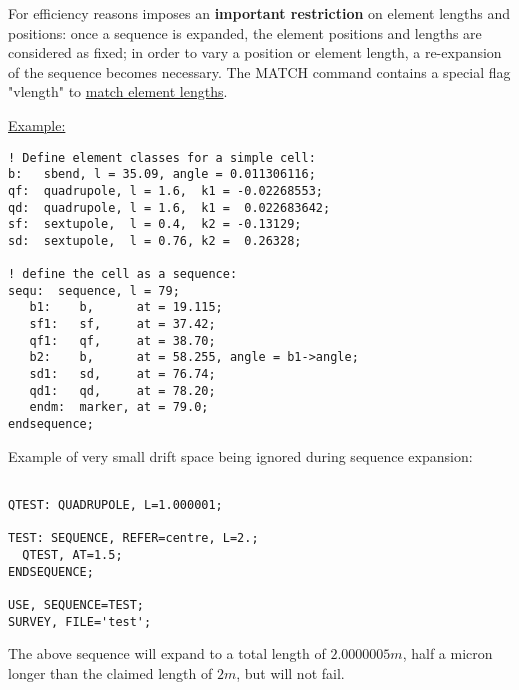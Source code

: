 For efficiency reasons \madx imposes an \textbf{important restriction}
on element lengths and positions: once a sequence is expanded, the
element positions and lengths are considered as fixed; in order to vary
a position or element length, a re-expansion of the sequence becomes
necessary. The MATCH command contains a special flag "vlength" to
\href{../match/match.html}{match element lengths}.  

\href{example}{Example:}
\begin{verbatim}
! Define element classes for a simple cell:
b:   sbend, l = 35.09, angle = 0.011306116;
qf:  quadrupole, l = 1.6,  k1 = -0.02268553;
qd:  quadrupole, l = 1.6,  k1 =  0.022683642;
sf:  sextupole,  l = 0.4,  k2 = -0.13129;
sd:  sextupole,  l = 0.76, k2 =  0.26328;

! define the cell as a sequence:
sequ:  sequence, l = 79;
   b1:    b,      at = 19.115;
   sf1:   sf,     at = 37.42;
   qf1:   qf,     at = 38.70;
   b2:    b,      at = 58.255, angle = b1->angle;
   sd1:   sd,     at = 76.74;
   qd1:   qd,     at = 78.20;
   endm:  marker, at = 79.0;
endsequence;
\end{verbatim}




Example of very small drift space being ignored during sequence
expansion: 
\begin{verbatim}

QTEST: QUADRUPOLE, L=1.000001;
 
TEST: SEQUENCE, REFER=centre, L=2.;
  QTEST, AT=1.5;	 
ENDSEQUENCE;	 

USE, SEQUENCE=TEST;
SURVEY, FILE='test';

\end{verbatim}
The above sequence will expand to a total length of $2.0000005 m$, half
a micron longer than the claimed length of $2 m$, but will not fail.
